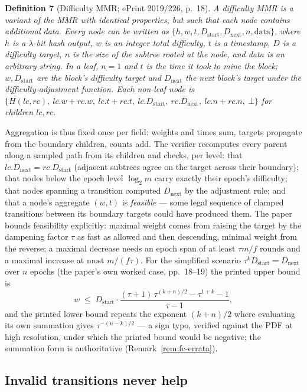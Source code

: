 \documentclass[11pt,a4paper]{article}
\theoremstyle{definition}
\begin{document}
\medskip
\noindent\textbf{Definition 7} (Difficulty MMR; ePrint 2019/226, p.~18).
\emph{A difficulty MMR is a variant of the MMR with identical properties,
but such that each node contains additional data. Every node can be written
as $\{h, w, t, D_{\mathrm{start}}, D_{\mathrm{next}}, n, \mathrm{data}\}$,
where $h$ is a $\lambda$-bit hash output, $w$ is an integer total
difficulty, $t$ is a timestamp, $D$ is a difficulty target, $n$ is the size
of the subtree rooted at the node, and data is an arbitrary string. In a
leaf, $n = 1$ and $t$ is the time it took to mine the block;
$w, D_{\mathrm{start}}$ are the block's difficulty target and
$D_{\mathrm{next}}$ the next block's target under the difficulty-adjustment
function. Each non-leaf node is
$\{H(lc, rc),\ lc.w + rc.w,\ lc.t + rc.t,\ lc.D_{\mathrm{start}},\
rc.D_{\mathrm{next}},\ lc.n + rc.n,\ \bot\}$ for children $lc, rc$.}
\medskip

Aggregation is thus fixed once per field: weights and times sum, targets
propagate from the boundary children, counts add. The verifier recomputes
every parent along a sampled path from its children and checks, per level:
that $lc.D_{\mathrm{next}} = rc.D_{\mathrm{start}}$ (adjacent subtrees
agree on the target across their boundary); that nodes below the epoch
level $\log_2 m$ carry exactly their epoch's difficulty; that nodes
spanning a transition computed $D_{\mathrm{next}}$ by the adjustment rule;
and that a node's aggregate $(w, t)$ is \emph{feasible} --- some legal
sequence of clamped transitions between its boundary targets could have
produced them. The paper bounds feasibility explicitly: maximal weight
comes from raising the target by the dampening factor $\tau$ as fast as
allowed and then descending, minimal weight from the reverse; a maximal
decrease needs an epoch span of at least $\tau m/f$ rounds and a maximal
increase at most $m/(f\tau)$. For the simplified scenario
$\tau^k D_{\mathrm{start}} = D_{\mathrm{next}}$ over $n$ epochs (the
paper's own worked case, pp.~18--19) the printed upper bound is
\[
w \;\le\; D_{\mathrm{start}} \cdot
\frac{(\tau+1)\,\tau^{(k+n)/2} - \tau^{1+k} - 1}{\tau - 1},
\]
and the printed lower bound repeats the exponent $(k+n)/2$ where evaluating
its own summation gives $\tau^{-(n-k)/2}$ --- a sign typo, verified against
the PDF at high resolution, under which the printed bound would be
negative; the summation form is authoritative (Remark~\ref{rem:fc-errata}).

\subsection{Invalid transitions never help}\label{sec:fc-lemma4}
\end{document}
